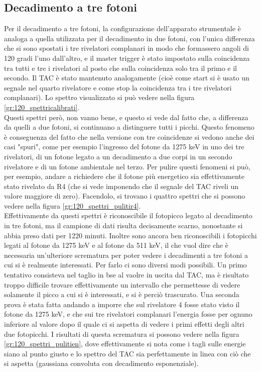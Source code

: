 \FloatBarrier
\subsection{Decadimento a tre fotoni}
Per il decadimento a tre fotoni, la configurazione dell'apparato strumentale è analoga a quella utilizzata per il decadimento in due fotoni, con l'unica differenza
che si sono spostati i tre rivelatori complanari in modo che formassero angoli di 120 gradi l'uno dall'altro, e il master trigger è stato impostato sulla coincidenza
tra tutti e tre i rivelatori al posto che sulla coincidenza solo tra il primo e il secondo. Il TAC è stato mantenuto analogamente (cioè come start si è usato un segnale
nel quarto rivelatore e come stop la coincidenza tra i tre rivelatori complanari). Lo spettro visualizzato si può vedere nella figura \ref{gr:120_spettricalibrati}.\\


Questi spettri però, non vanno bene, e questo si vede dal fatto che, a differenza da quelli a due fotoni, si continuano a distinguere tutti i picchi. Questo fenomeno
è conseguenza del fatto che nella versione con tre coincidenze si vedono anche dei casi "spuri", come per esempio l'ingresso del fotone da 1275 keV in uno dei tre rivelatori,
di un fotone legato a un decadimento a due corpi in un secondo rivelatore e di un fotone ambientale nel terzo. Per pulire questi fenomeni si può, per esempio, andare a
richiedere che il fotone più energetico sia effettivamente stato rivelato da R4 (che si vede imponendo che il segnale del TAC riveli un valore maggiore di zero). Facendolo,
si trovano i quattro spettri che si possono vedere nella figura \ref{gr:120_spettri_pulitir4}.\\


Effettivamente da questi spettri è riconoscibile il fotopicco legato al decadimento in tre fotoni, ma il campione di dati risulta decisamente scarno, nonostante si abbia
preso dati per 1220 minuti. Inoltre sono ancora ben riconoscibili i fotopicchi legati al fotone da 1275 keV e al fotone da 511 keV, il che vuol dire che è necessaria 
un'ulteriore scrematura per poter vedere i decadimenti a tre fotoni a cui si è realmente interessati. Per farlo ci sono diversi modi possibili. Un primo tentativo consisteva
nel taglio in bse al vaolre in uscita dal TAC, ma è risultato troppo difficile trovare effettivamente un intervallo che permettesse di vedere solamente il picco a cui
si è interessati, e si è perciò trascurato. Una seconda prova è stata fatta andando a imporre che sul rivelatore 4 fosse stato visto il fotone da 1275 keV, e che sui tre
rivelatori complanari l'energia fosse per ognuno inferiore al valore dopo il quale ci si aspetta di vedere i primi effetti degli altri due fotopicchi. I risultati
di questa scrematura si possono vedere nella figura \ref{gr:120_spettri_pulitien}, dove effettivamente si nota come i tagli sulle energie siano al punto giusto e lo
spettro del TAC sia perfettamente in linea con ciò che si aspetta (gaussiana convoluta con decadimento esponenziale).\\


